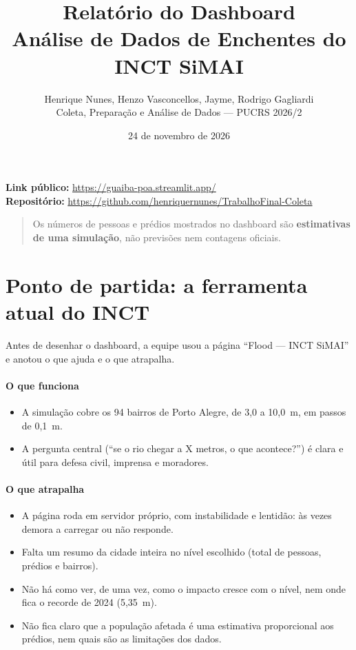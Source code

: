 \documentclass[11pt,a4paper]{article}
\title{Relatório do Dashboard\\\large Análise de Dados de Enchentes do INCT SiMAI}
\author{Henrique Nunes, Henzo Vasconcellos, Jayme, Rodrigo Gagliardi\\Coleta, Preparação e Análise de Dados --- PUCRS 2026/2}
\date{24 de novembro de 2026}
\begin{document}
\maketitle

\noindent\textbf{Link público:} \url{https://guaiba-poa.streamlit.app/}\\
\textbf{Repositório:} \url{https://github.com/henriquernunes/TrabalhoFinal-Coleta}

\begin{quote}
Os números de pessoas e prédios mostrados no dashboard são \textbf{estimativas de uma simulação}, não previsões nem contagens oficiais.
\end{quote}

\section{Ponto de partida: a ferramenta atual do INCT}
Antes de desenhar o dashboard, a equipe usou a página ``Flood --- INCT SiMAI'' e anotou o que ajuda e o que atrapalha.

\paragraph{O que funciona}
\begin{itemize}
  \item A simulação cobre os 94 bairros de Porto Alegre, de 3,0 a 10,0~m, em passos de 0,1~m.
  \item A pergunta central (``se o rio chegar a X metros, o que acontece?'') é clara e útil para defesa civil, imprensa e moradores.
\end{itemize}

\paragraph{O que atrapalha}
\begin{itemize}
  \item A página roda em servidor próprio, com instabilidade e lentidão: às vezes demora a carregar ou não responde.
  \item Falta um resumo da cidade inteira no nível escolhido (total de pessoas, prédios e bairros).
  \item Não há como ver, de uma vez, como o impacto cresce com o nível, nem onde fica o recorde de 2024 (5,35~m).
  \item Não fica claro que a população afetada é uma estimativa proporcional aos prédios, nem quais são as limitações dos dados.
\end{itemize}
\end{document}
